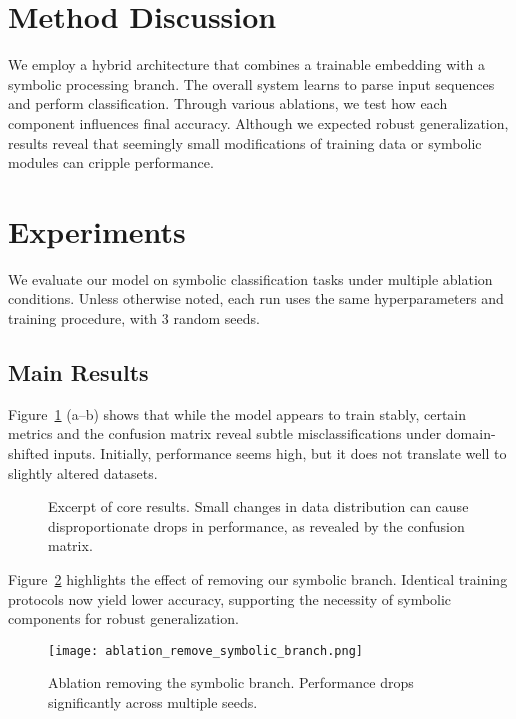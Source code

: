 \documentclass{article}
\begin{document}
\section{Method Discussion}
We employ a hybrid architecture that combines a trainable embedding with a symbolic processing branch. The overall system learns to parse input sequences and perform classification. Through various ablations, we test how each component influences final accuracy. Although we expected robust generalization, results reveal that seemingly small modifications of training data or symbolic modules can cripple performance.

\section{Experiments}
We evaluate our model on symbolic classification tasks under multiple ablation conditions. Unless otherwise noted, each run uses the same hyperparameters and training procedure, with 3 random seeds.

\subsection{Main Results}
Figure~\ref{fig:main} (a--b) shows that while the model appears to train stably, certain metrics and the confusion matrix reveal subtle misclassifications under domain-shifted inputs. Initially, performance seems high, but it does not translate well to slightly altered datasets.

\begin{figure}[t]
\centering
{}
\caption{Excerpt of core results. Small changes in data distribution can cause disproportionate drops in performance, as revealed by the confusion matrix.}
\label{fig:main}
\end{figure}

Figure~\ref{fig:ablation-main} highlights the effect of removing our symbolic branch. Identical training protocols now yield lower accuracy, supporting the necessity of symbolic components for robust generalization.

\begin{figure}[t]
\centering
\texttt{[image: ablation\_remove\_symbolic\_branch.png]}
\caption{Ablation removing the symbolic branch. Performance drops significantly across multiple seeds.}
\label{fig:ablation-main}
\end{figure}
\end{document}

